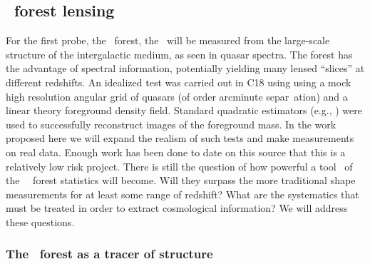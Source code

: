 \subsection{\lya\ forest lensing}


For the first probe, the \lya\ forest,  the \atf\ will be measured
from the large-scale structure of the intergalactic medium, as 
seen in quasar spectra.  
The forest has the advantage of spectral information,
potentially yielding many lensed ``slices'' at different redshifts.
An idealized test was carried out in C18 using using a mock high
resolution angular grid of quasars (of order arcminute separ\ ation)
and a linear theory foreground density field. Standard quadratic
estimators (e.g., \cite{okamoto}) were used to successfully
reconstruct images of the foreground mass. In the work
proposed here we will expand the realism of such tests and make
measurements on real data. Enough work has been done to  date on this
source that this is a relatively low risk project. There is still the
question of how powerful a tool \atf\ of the \lya\ \ forest statistics
will become. Will they surpass the more traditional shape
measurements for at least some range of redshift? What are the
systematics that must be treated in order to extract cosmological
information? We will address these
questions.


\subsubsection{The \lya\ forest as a tracer of structure}

